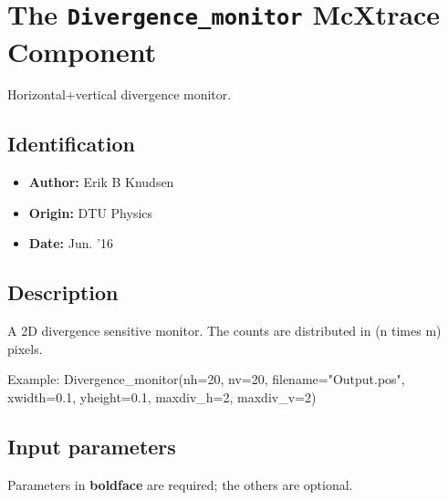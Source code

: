 \section{The \texttt{Divergence\_monitor} McXtrace Component}
Horizontal+vertical divergence monitor.

\subsection*{Identification}
\begin{itemize}
  \item \textbf{Author:} Erik B Knudsen
  \item \textbf{Origin:} DTU Physics
  \item \textbf{Date:} Jun. '16
\end{itemize}

\subsection*{Description}
A 2D divergence sensitive monitor. The counts are distributed in (n times m) pixels.

Example: Divergence\_monitor(nh=20, nv=20, filename="Output.pos", xwidth=0.1, yheight=0.1, maxdiv\_h=2, maxdiv\_v=2)

\subsection*{Input parameters}
Parameters in \textbf{boldface} are required; the others are optional.

